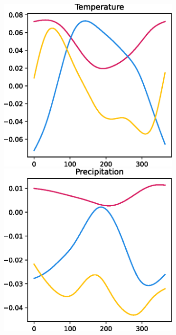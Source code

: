 \begin{figure}
    \centering
    \begin{subfigure}[b]{0.3\textwidth}
    \centering
    \includegraphics[width=\textwidth]{figures/eigen_temp_gram.eps}
    \includegraphics[width=\textwidth]{figures/eigen_prec_gram.eps}

\end{subfigure}
\end{figure}
